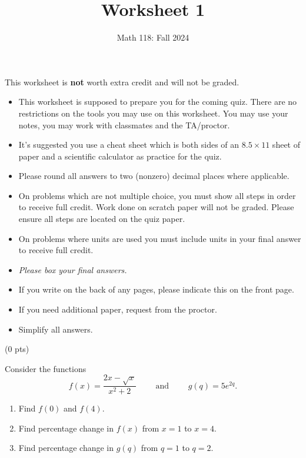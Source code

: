 \documentclass{ximera}
\title{Worksheet 1}
\author{Math 118: Fall 2024}
\begin{document}
\normalsize

\begin{center}
    {\large This worksheet is \textbf{not} worth extra credit and will not be graded.}
\end{center}

\begin{itemize}
    \item This worksheet is supposed to prepare you for the coming quiz. There are no restrictions on the tools you may use on this worksheet. You may use your notes, you may work with classmates and the TA/proctor. 
    \item It's suggested you use a cheat sheet which is both sides of an $8.5\times 11$ sheet of paper and a scientific calculator as practice for the quiz.
    \item Please round all answers to two (nonzero) decimal places where applicable.
    \item On problems which are not multiple choice, you must show all steps in order to receive full credit. Work done on scratch paper will not be graded. Please ensure all steps are located on the quiz paper. 
    \item On problems where units are used you must include units in your final answer to receive full credit.
    \item {\it Please box your final answers.}
    \item If you write on the back of any pages, please indicate this on the front page.
    \item If you need additional paper, request from the proctor.
    \item Simplify all answers.
\end{itemize}


 (0 pts)

Consider the functions $$f(x)=\frac{2x-\sqrt{x}}{x^2+2}\qquad\text{ and }\qquad g(q)=5e^{2q}.$$

     \begin{enumerate}[label=(\alph*)]
        \item Find $f(0)$ and $f(4)$.  \vspace{5cm}
        \item Find percentage change in $f(x)$ from $x=1$ to $x=4$. \vspace{5cm}
        \item Find percentage change in $g(q)$ from $q=1$ to $q=2$. 
    \end{enumerate}
\end{document}
